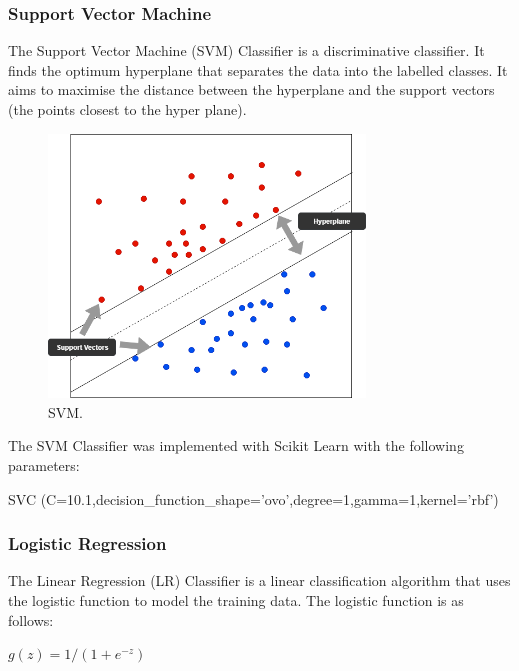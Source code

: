 \subsubsection*{Support Vector Machine}

The Support Vector Machine (SVM) Classifier is a discriminative classifier. It finds the optimum hyperplane that separates the data into the labelled classes. It aims to maximise the distance between the hyperplane and the support vectors (the points closest to the hyper plane).

\begin{figure}[h!]
\centering
\includegraphics[width=0.75\textwidth]{design_and_methodology/svm.png}
\caption{\label{fig:svm} SVM.}
\end{figure}

The SVM Classifier was implemented with Scikit Learn with the following parameters:

\begin{tcolorbox}
\begin{center}
	SVC (C=10.1,decision\_function\_shape='ovo',degree=1,gamma=1,kernel='rbf')
\end{center}
\end{tcolorbox}

\subsubsection*{Logistic Regression}

The Linear Regression (LR) Classifier is a linear classification algorithm that uses the logistic function to model the training data. The logistic function is as follows:
\begin{center}
  \(g(z)=1/(1+e^{-z})\)  
\end{center}


